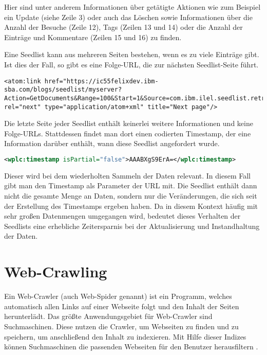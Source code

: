 Hier sind unter anderem Informationen über getätigte Aktionen wie zum Beispiel ein Update (siehe Zeile 3) oder auch das Löschen sowie Informationen über die Anzahl der Besuche (Zeile 12), Tags (Zeilen 13 und 14) oder die Anzahl der Einträge und Kommentare (Zeilen 15 und 16) zu finden.

Eine Seedlist kann aus mehreren Seiten bestehen, wenn es zu viele Einträge gibt. Ist dies der Fall, so gibt es eine Folge-URL, die zur nächsten Seedlist-Seite führt. \\
\begin{lstlisting}[title=Darstellung der Folge-URL in der Seedlist]
<atom:link href="https://ic55felixdev.ibm-sba.com/blogs/seedlist/myserver?Action=GetDocuments&Range=100&Start=1&Source=com.ibm.ilel.seedlist.retriever.connections.blogs.BlogsRetrieverFactory&Format=atom&Locale=en_US&State=MTsxNDk3ODcyMDE0Mjg5OzA7MTUwMzMxODA1MzU1Mjt0cnVlOzA7MA%3D%3D" rel="next" type="application/atom+xml" title="Next page"/>
\end{lstlisting}

Die letzte Seite jeder Seedlist enthält keinerlei weitere Informationen und keine Folge-URLs. Stattdessen findet man dort einen codierten Timestamp, der eine Information darüber enthält, wann diese Seedlist angefordert wurde. \\

\noindent
\begin{minipage}{\linewidth}
\begin{lstlisting}[title=Beispiel eines Timestamps: AAABXgS9ErA, language=XML]
<wplc:timestamp isPartial="false">AAABXgS9ErA=</wplc:timestamp>
\end{lstlisting}
\end{minipage}

Dieser wird bei dem wiederholten Sammeln der Daten relevant. In diesem Fall gibt man den Timestamp als Parameter der URL mit. Die Seedlist enthält dann nicht die gesamte Menge an Daten, sondern nur die Veränderungen, die sich seit der Erstellung des Timestamps ergeben haben. Da in diesem Kontext häufig mit sehr großen Datenmengen umgegangen wird, bedeutet dieses Verhalten der Seedlists eine erhebliche Zeitersparnis bei der Aktualisierung und Instandhaltung der Daten.


\newpage

\section{Web-Crawling}
\large
Ein Web-Crawler (auch Web-Spider genannt) ist ein Programm, welches automatisch allen Links auf einer Webseite folgt und den Inhalt der Seiten herunterlädt. Das größte Anwendungsgebiet für Web-Crawler sind Suchmaschinen. Diese nutzen die Crawler, um Webseiten zu finden und zu speichern, um anschließend den Inhalt zu indexieren. Mit Hilfe dieser Indizes können Suchmaschinen die passenden Webseiten für den Benutzer herausfiltern \cite{crawl}.

